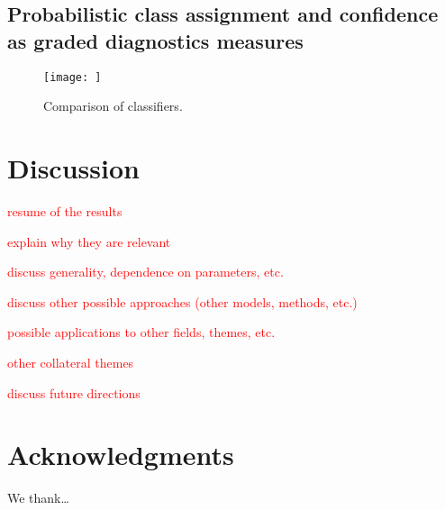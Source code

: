 \documentclass[12pt, a4paper, final, fleqn]{article}
\begin{document}
\subsection{Probabilistic class assignment and confidence as graded diagnostics measures}
\begin{figure}[b]
\begin{center}
\texttt{[image: ]}
  \caption[Comparison of classifiers]{Comparison of classifiers.
	  \label{fig:clf_comp}}
\end{center}
\end{figure}

\section{Discussion}
\label{discussion}

\textcolor{red}{resume of the results}

\textcolor{red}{explain why they are relevant}

\textcolor{red}{discuss generality, dependence on parameters, etc.}

\textcolor{red}{discuss other possible approaches (other models, methods, etc.)}

\textcolor{red}{possible applications to other fields, themes, etc.}

\textcolor{red}{other collateral themes}

\textcolor{red}{discuss future directions}

\section*{Acknowledgments}

We thank\dots 




\clearpage

\end{document}
